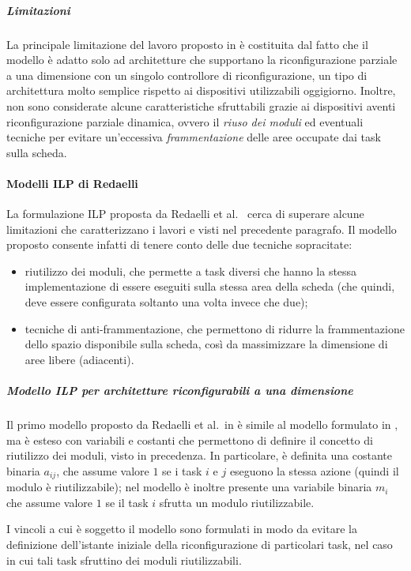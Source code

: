 \subparagraph{Limitazioni}
La principale limitazione del lavoro proposto in 
\cite{BanerjeePhysicalConstraints} è costituita dal fatto che il modello è 
adatto solo ad architetture che supportano la riconfigurazione parziale a una 
dimensione con un singolo controllore di riconfigurazione, un tipo di 
architettura molto semplice rispetto ai dispositivi utilizzabili oggigiorno. 
Inoltre, non sono considerate alcune caratteristiche sfruttabili grazie ai 
dispositivi aventi riconfigurazione parziale dinamica, ovvero il \emph{riuso 
dei moduli} ed eventuali tecniche per evitare un'eccessiva \emph{frammentazione} 
delle aree occupate dai task sulla scheda.


\paragraph{Modelli \acs{ILP} di Redaelli}
La formulazione \ac{ILP} proposta da Redaelli et al.~\cite{Redaelli1DILP} cerca 
di superare alcune limitazioni che caratterizzano i lavori 
\cite{BanerjeeHwSwPartitioning} e \cite{BanerjeePhysicalConstraints} visti nel 
precedente paragrafo. %
Il modello proposto consente infatti di tenere conto delle due tecniche 
sopracitate:
\begin{itemize}
 \item riutilizzo dei moduli, che permette a task diversi che hanno la stessa 
implementazione di essere eseguiti sulla stessa area della scheda (che quindi, 
deve essere configurata soltanto una volta invece che due);
 \item tecniche di anti-frammentazione, che permettono di ridurre la 
frammentazione dello spazio disponibile sulla scheda, così da massimizzare la 
dimensione di aree libere (adiacenti).
\end{itemize}

\subparagraph{Modello \acs{ILP} per architetture riconfigurabili a una 
dimensione}
Il primo modello proposto da Redaelli et al.~in \cite{Redaelli1DILP} è simile 
al modello formulato in \cite{BanerjeePhysicalConstraints}, ma è esteso con 
variabili e costanti che permettono di definire il concetto di riutilizzo dei 
moduli, visto in precedenza. In particolare, è definita una costante 
binaria $a_{ij}$, che assume valore $1$ se i task $i$ e $j$ eseguono la stessa 
azione (quindi il modulo è riutilizzabile); nel modello è inoltre presente una 
variabile binaria $m_i$ che assume valore $1$ se il task $i$ sfrutta un modulo 
riutilizzabile.

I vincoli a cui è soggetto il modello sono formulati in modo da evitare la 
definizione dell'istante iniziale della riconfigurazione di particolari task, 
nel caso in cui tali task sfruttino dei moduli riutilizzabili.

